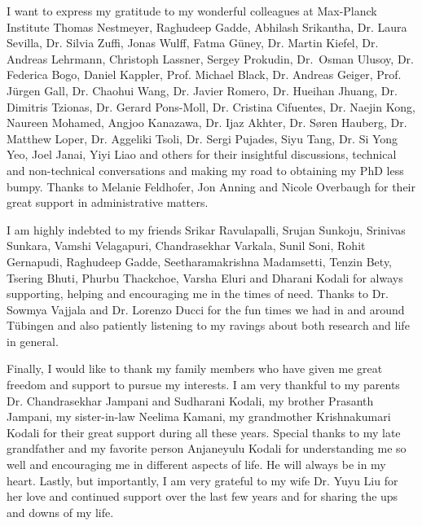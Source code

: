 I want to express my gratitude to my wonderful colleagues at Max-Planck Institute
Thomas Nestmeyer, Raghudeep Gadde, Abhilash Srikantha, Dr. Laura Sevilla, Dr. Silvia Zuffi, Jonas Wulff,
Fatma G\"uney, Dr. Martin Kiefel,
Dr. Andreas Lehrmann, Christoph Lassner, Sergey Prokudin, Dr.~Osman Ulusoy,
Dr. Federica Bogo, Daniel Kappler, Prof. Michael Black,
Dr. Andreas Geiger, Prof. J\"urgen Gall, Dr. Chaohui Wang, Dr. Javier Romero,
Dr. Hueihan Jhuang, Dr. Dimitris Tzionas, Dr. Gerard Pons-Moll,
Dr. Cristina Cifuentes, Dr. Naejin Kong, Naureen Mohamed, Angjoo Kanazawa,
Dr. Ijaz Akhter, Dr. S{\o}ren Hauberg, Dr. Matthew Loper, Dr. Aggeliki Tsoli,
Dr. Sergi Pujades, Siyu Tang, Dr. Si Yong Yeo, Joel Janai, Yiyi Liao and others
for their insightful discussions, technical and non-technical conversations and making my
road to obtaining my PhD less bumpy. Thanks to Melanie Feldhofer, Jon Anning
and Nicole Overbaugh for their great support in administrative matters.

I am highly indebted to my friends Srikar Ravulapalli, Srujan Sunkoju, Srinivas Sunkara,
Vamshi Velagapuri, Chandrasekhar Varkala, Sunil Soni, Rohit Gernapudi, Raghudeep Gadde,
Seetharamakrishna Madamsetti, Tenzin Bety, Tsering Bhuti, Phurbu Thackchoe, Varsha Eluri
and Dharani Kodali for always supporting, helping and encouraging me in the times of need.
Thanks to Dr. Sowmya Vajjala and Dr. Lorenzo Ducci
for the fun times we had in and around T\"ubingen and also patiently listening to my
ravings about both research and life in general.

Finally, I would like to thank my family members who have given me great freedom and support
to pursue my interests. I am very thankful to my parents
Dr. Chandrasekhar Jampani and Sudharani Kodali, my brother Prasanth Jampani, my sister-in-law Neelima Kamani,
my grandmother Krishnakumari Kodali for their great support during all these years.
Special thanks to my late grandfather and my favorite person Anjaneyulu Kodali for
understanding me so well and encouraging me in different aspects of life. He will always
be in my heart. Lastly, but importantly, I am very grateful to my wife
Dr. Yuyu Liu for her love and continued support over the last few years and for sharing
the ups and downs of my life.
